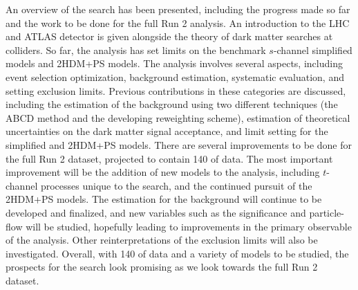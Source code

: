 \label{chapter:conclusions}

An overview of the \monoZ search has been presented, including the progress made so far and the work to be done for the full Run 2 analysis. An introduction to the LHC and ATLAS detector is given alongside the theory of dark matter searches at colliders. So far, the \monoZ analysis has set limits on the benchmark $s$-channel simplified models and 2HDM+PS models. The analysis involves several aspects, including event selection optimization, background estimation, systematic evaluation, and setting exclusion limits. Previous contributions in these categories are discussed, including the estimation of the \Zjets background using two different techniques (the ABCD method and the developing \gjets reweighting scheme), estimation of theoretical uncertainties on the dark matter signal acceptance, and limit setting for the simplified and 2HDM+PS models. There are several improvements to be done for the full Run 2 dataset, projected to contain 140 \ifb of data. The most important improvement will be the addition of new models to the analysis, including $t$-channel processes unique to the \monoZ search, and the continued pursuit of the 2HDM+PS models. The \gjets estimation for the \Zjets background will continue to be developed and finalized, and new variables such as the \etmiss significance and particle-flow \etmiss will be studied, hopefully leading to improvements in the primary observable of the analysis. Other reinterpretations of the \monoZ exclusion limits will also be investigated. Overall, with 140 \ifb of data and a variety of models to be studied, the prospects for the \monoZ search look promising as we look towards the full Run 2 dataset.